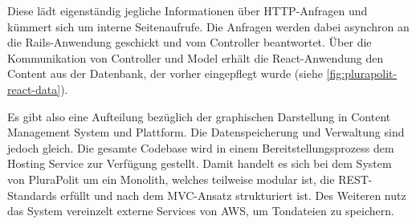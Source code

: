 
Diese lädt eigenständig jegliche Informationen über HTTP-Anfragen und kümmert sich um interne Seitenaufrufe. Die Anfragen werden dabei asynchron an die Rails-Anwendung geschickt und vom Controller beantwortet. Über die Kommunikation von Controller und Model erhält die React-Anwendung den Content aus der Datenbank, der vorher eingepflegt wurde (siehe \cref{fig:plurapolit-react-data}).

Es gibt also eine Aufteilung bezüglich der graphischen Darstellung in Content Management System und Plattform. Die Datenspeicherung und Verwaltung sind jedoch gleich. Die gesamte Codebase wird in einem Bereitstellungsprozess dem Hosting Service zur Verfügung gestellt. Damit handelt es sich bei dem System von PluraPolit um ein Monolith, welches teilweise modular ist, die REST-Standards erfüllt und nach dem MVC-Ansatz strukturiert ist. Des Weiteren nutz das System vereinzelt externe Services von AWS, um Tondateien zu speichern.
